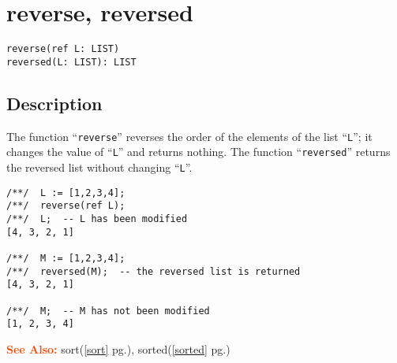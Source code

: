\documentclass[a4paper]{mybook}
\newenvironment{command}{}{} %
\newcommand\SeeAlso{\par\textcolor{OrangeRed}{\textbf{\large See Also: }}}
\begin{document}
\section{reverse, reversed}
\label{reverse, reversed}
\begin{command} %


\begin{Verbatim}[label=syntax, rulecolor=\color{MidnightBlue},
frame=single]
reverse(ref L: LIST)
reversed(L: LIST): LIST
\end{Verbatim}


\subsection*{Description}

The function ``\verb&reverse&'' reverses the order of the elements of the
list ``\verb&L&''; it changes the value of ``\verb&L&'' and returns nothing.
The function ``\verb&reversed&'' returns the reversed list without changing ``\verb&L&''.
\begin{Verbatim}[label=example, rulecolor=\color{PineGreen}, frame=single]
/**/  L := [1,2,3,4];
/**/  reverse(ref L);
/**/  L;  -- L has been modified
[4, 3, 2, 1]

/**/  M := [1,2,3,4];
/**/  reversed(M);  -- the reversed list is returned
[4, 3, 2, 1]

/**/  M;  -- M has not been modified
[1, 2, 3, 4]
\end{Verbatim}


\SeeAlso %
  sort(\ref{sort} pg.\pageref{sort}), 
    sorted(\ref{sorted} pg.\pageref{sorted})
\end{command} %
\end{document}

